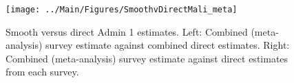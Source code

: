 \documentclass[12pt]{article}\usepackage[]{graphicx}\usepackage[]{color}
\newenvironment{knitrout}{}{} %
\begin{document}



\begin{knitrout}
\color{fgcolor}\begin{figure}[bht]

{\centering \texttt{[image: ../Main/Figures/SmoothvDirectMali\_meta]} 

}

\caption[Smooth versus direct Admin 1 estimates]{Smooth versus direct Admin 1 estimates. Left: Combined (meta-analysis) survey estimate against combined direct estimates. Right: Combined (meta-analysis) survey estimate against direct estimates from each survey.}\label{fig:unnamed-chunk-213}
\end{figure}


\end{knitrout}
\end{document}
